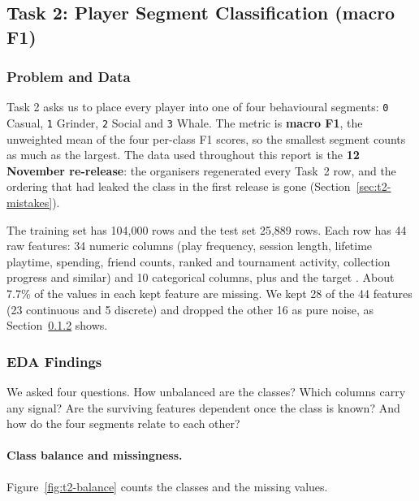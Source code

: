 \documentclass[../main.tex]{subfiles}
\begin{document}
\graphicspath{{figures/}{task2/figures/}}
\begingroup
\captionsetup[table]{justification=raggedright,singlelinecheck=false}

\subsection{Task 2: Player Segment Classification (macro F1)}
\label{sec:t2}

\subsubsection{Problem and Data}

Task 2 asks us to place every player into one of four behavioural segments: \texttt{0} Casual, \texttt{1} Grinder, \texttt{2} Social and \texttt{3} Whale. The metric is \textbf{macro F1}, the unweighted mean of the four per-class F1 scores, so the smallest segment counts as much as the largest. The data used throughout this report is the \textbf{12 November re-release}: the organisers regenerated every Task~2 row, and the  ordering that had leaked the class in the first release is gone (Section~\ref{sec:t2-mistakes}).

The training set has 104{,}000 rows and the test set 25{,}889 rows. Each row has 44 raw features: 34 numeric columns (play frequency, session length, lifetime playtime, spending, friend counts, ranked and tournament activity, collection progress and similar) and 10 categorical columns, plus  and the target . About 7.7\% of the values in each kept feature are missing. We kept 28 of the 44 features (23 continuous and 5 discrete) and dropped the other 16 as pure noise, as Section~\ref{sec:t2-eda} shows.

\subsubsection{EDA Findings}
\label{sec:t2-eda}

We asked four questions. How unbalanced are the classes? Which columns carry any signal? Are the surviving features dependent once the class is known? And how do the four segments relate to each other?

\paragraph{Class balance and missingness.} Figure~\ref{fig:t2-balance} counts the classes and the missing values.
\end{document}
